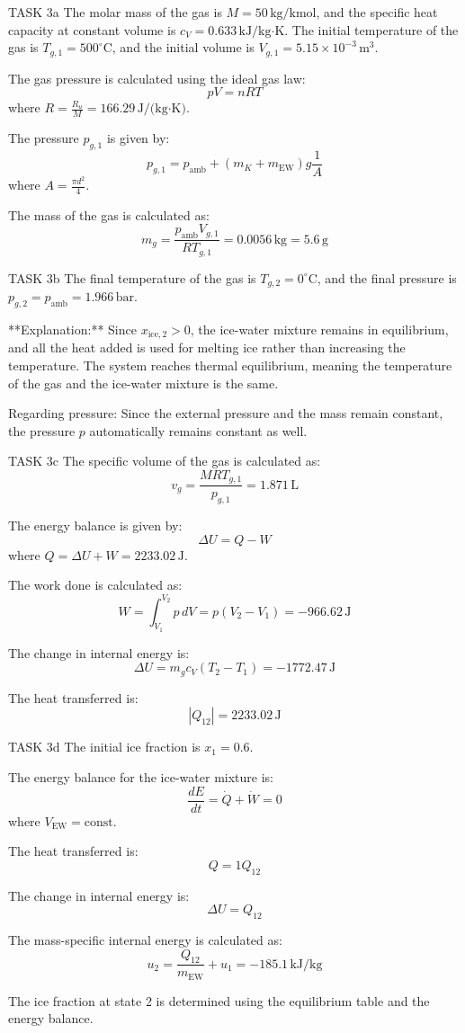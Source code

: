 TASK 3a  
The molar mass of the gas is \( M = 50 \, \text{kg/kmol} \), and the specific heat capacity at constant volume is \( c_V = 0.633 \, \text{kJ/kg·K} \). The initial temperature of the gas is \( T_{g,1} = 500^\circ\text{C} \), and the initial volume is \( V_{g,1} = 5.15 \times 10^{-3} \, \text{m}^3 \).  

The gas pressure is calculated using the ideal gas law:  
\[
p V = n R T
\]  
where \( R = \frac{R_u}{M} = 166.29 \, \text{J/(kg·K)} \).  

The pressure \( p_{g,1} \) is given by:  
\[
p_{g,1} = p_{\text{amb}} + \left( m_K + m_{\text{EW}} \right) g \frac{1}{A}
\]  
where \( A = \frac{\pi d^2}{4} \).  

The mass of the gas is calculated as:  
\[
m_g = \frac{p_{\text{amb}} V_{g,1}}{R T_{g,1}} = 0.0056 \, \text{kg} = 5.6 \, \text{g}
\]  

TASK 3b  
The final temperature of the gas is \( T_{g,2} = 0^\circ\text{C} \), and the final pressure is \( p_{g,2} = p_{\text{amb}} = 1.966 \, \text{bar} \).  

**Explanation:**  
Since \( x_{\text{ice},2} > 0 \), the ice-water mixture remains in equilibrium, and all the heat added is used for melting ice rather than increasing the temperature. The system reaches thermal equilibrium, meaning the temperature of the gas and the ice-water mixture is the same.  

Regarding pressure: Since the external pressure and the mass remain constant, the pressure \( p \) automatically remains constant as well.  

TASK 3c  
The specific volume of the gas is calculated as:  
\[
v_g = \frac{M R T_{g,1}}{p_{g,1}} = 1.871 \, \text{L}
\]  

The energy balance is given by:  
\[
\Delta U = Q - W
\]  
where \( Q = \Delta U + W = 2233.02 \, \text{J} \).  

The work done is calculated as:  
\[
W = \int_{V_1}^{V_2} p \, dV = p (V_2 - V_1) = -966.62 \, \text{J}
\]  

The change in internal energy is:  
\[
\Delta U = m_g c_V (T_2 - T_1) = -1772.47 \, \text{J}
\]  

The heat transferred is:  
\[
|Q_{12}| = 2233.02 \, \text{J}
\]  

TASK 3d  
The initial ice fraction is \( x_1 = 0.6 \).  

The energy balance for the ice-water mixture is:  
\[
\frac{dE}{dt} = \dot{Q} + \dot{W} = 0
\]  
where \( V_{\text{EW}} = \text{const} \).  

The heat transferred is:  
\[
Q = 1 Q_{12}
\]  

The change in internal energy is:  
\[
\Delta U = Q_{12}
\]  

The mass-specific internal energy is calculated as:  
\[
u_2 = \frac{Q_{12}}{m_{\text{EW}}} + u_1 = -185.1 \, \text{kJ/kg}
\]  

The ice fraction at state 2 is determined using the equilibrium table and the energy balance.